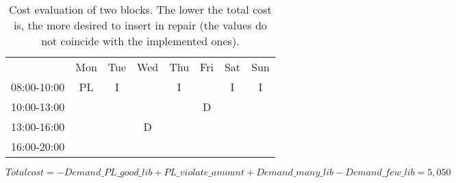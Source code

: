 \begin{table}[!h]
\centering
\caption{Cost evaluation of two blocks. The lower the total cost is, the more desired to insert in repair (the values do not coincide with the implemented ones).}
\label{tab:block_costs}
\begin{tabular}{cccccccc}
                                 & Mon                                             & Tue                    & Wed                                            & Thu                    & Fri                                            & Sat                    & Sun                    \\ \cline{2-8} 
\multicolumn{1}{c|}{08:00-10:00} & \multicolumn{1}{c|}{\cellcolor[HTML]{FCFF2F}PL} & \multicolumn{1}{c|}{I} & \multicolumn{1}{c|}{} & \multicolumn{1}{c|}{I} & \multicolumn{1}{c|}{} & \multicolumn{1}{c|}{I} & \multicolumn{1}{c|}{I} \\ \cline{2-8} 
\multicolumn{1}{c|}{10:00-13:00} & \multicolumn{1}{c|}{\cellcolor[HTML]{FCFF2F}}   & \multicolumn{1}{c|}{}  & \multicolumn{1}{c|}{} & \multicolumn{1}{c|}{}  & \multicolumn{1}{c|}{\cellcolor[HTML]{FCFF2F}D} &     &   \\ \cline{2-6}
\multicolumn{1}{c|}{13:00-16:00} & \multicolumn{1}{c|}{\cellcolor[HTML]{FCFF2F}}   & \multicolumn{1}{c|}{}  & \multicolumn{1}{c|}{\cellcolor[HTML]{FCFF2F}D} & \multicolumn{1}{c|}{}  & \multicolumn{1}{c|}{}         &            &          \\ \cline{2-6}
\multicolumn{1}{c|}{16:00-20:00} & \multicolumn{1}{c|}{}  & \multicolumn{1}{c|}{}  & \multicolumn{1}{c|}{} & \multicolumn{1}{c|}{}  & \multicolumn{1}{c|}{} &         &         \\ \cline{2-6}
\end{tabular}
\newline
$Total cost = -Demand\_PL\_good\_lib + PL\_violate\_amount + Demand\_many\_lib - Demand\_few\_lib = 5,050$


\end{table}

